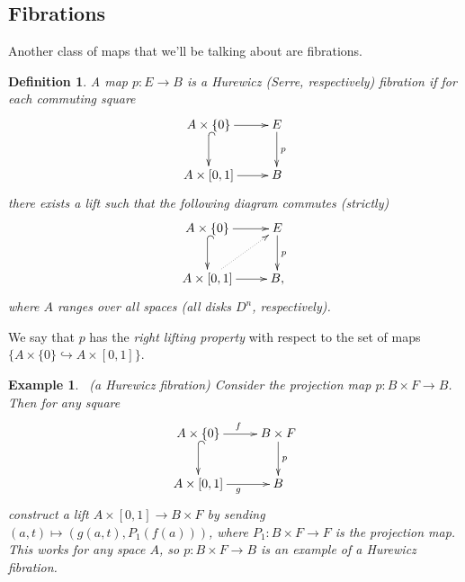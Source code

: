 \documentclass{article}
\newtheorem{definition}[theorem]{Definition}
\newtheorem{example}[theorem]{Example}
\newtheorem{proposed work}[theorem]{Proposed Work}
\newcommand{\xymat}[1]{\begin{align*}\xymatrix{ #1}\end{align*}}
\begin{document}
\subsection{Fibrations}
Another class of maps that we'll be talking about are fibrations.
\begin{definition}
A map $p:E\to B$ is a Hurewicz (Serre, respectively) fibration if for each commuting square
\xymat{A\times \lbrace 0\rbrace \ar[r] \ar@{^{(}->}[d] & E \ar[d]^p \\ A\times [0,1] \ar[r] & B} 
there exists a lift such that the following diagram commutes (strictly)
\xymat{A\times \lbrace 0\rbrace \ar[r] \ar@{^{(}->}[d] & E \ar[d]^p \\ A\times [0,1] \ar[r]\ar@{.>}[ur] & B,}
where $A$ ranges over all spaces (all disks $D^n$, respectively).
\end{definition}
We say that $p$ has the \textit{right lifting property} with respect to the set of maps $\lbrace A\times \lbrace 0\rbrace\hookrightarrow A\times [0,1]\rbrace$.

\begin{example}~\label{projfib}(a Hurewicz fibration) Consider the projection map $p: B\times F\to B$. Then for any square
\xymat{A\times \lbrace 0\rbrace \ar[r]^f \ar@{^{(}->}[d] & B\times F \ar[d]^p \\ A\times [0,1] \ar[r]_g & B}
construct a lift $A \times [0,1] \to B \times F$ by sending $(a,t)\mapsto (g(a,t), P_1(f(a)))$, where $P_1: B\times F\to F$ is the projection map. This works for any space $A$, so $p : B\times F\to B$ is an example of a Hurewicz fibration. 
\end{example}
\end{document}
